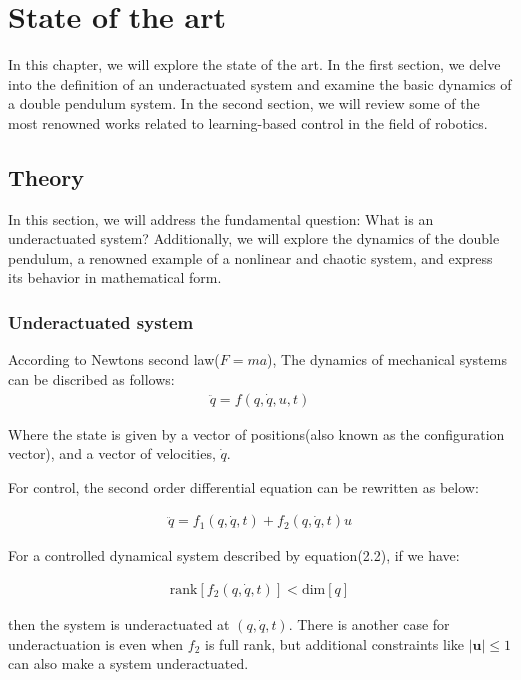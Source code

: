 \chapter{State of the art}
In this chapter, we will explore the state of the art. In the first section, we delve into the definition of an underactuated system and examine the basic dynamics of a double pendulum system. In the second section, we will review some of the most renowned works related to learning-based control in the field of robotics.

\section{Theory}
In this section, we will address the fundamental question: What is an underactuated system? Additionally, we will explore the dynamics of the double pendulum, a renowned example of a nonlinear and chaotic system, and express its behavior in mathematical form.

\subsection{Underactuated system}
According to Newtons second law(\( F = ma \)), The dynamics of mechanical systems can be discribed as follows:
\begin{align}
    \ddot{q} = f(q, \dot{q}, u, t)
\end{align}

Where the state is given by a vector of positions(also known as the configuration vector), and a vector of velocities, \( \dot{q}\).

For control, the second order differential equation can be rewritten as below:

\begin{align}
    \ddot{q} = f_1(q, \dot{q}, t) + f_2(q, \dot{q}, t)u
\end{align}

For a controlled dynamical system described by equation(2.2), if we have:

\begin{align}
    \text{rank}[f_2(q, \dot{q}, t)] < \text{dim}[q]
\end{align}

then the system is underactuated at \((q, \dot{q}, t)\)\cite{tedrake2022underactuated}. There is another case for underactuation is even when \(f_2\) is full rank, but additional constraints like \(|\mathbf{u}| \leq 1\) can also make a system underactuated.


